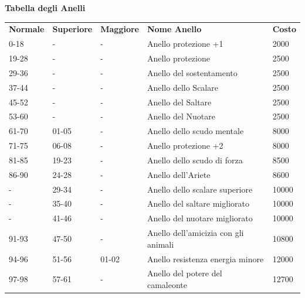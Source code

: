 \documentclass[a4paper,11pt,twoside,openany]{book}
\begin{document}
\textbf{Tabella degli Anelli}

\medskip

\begin{tabular}{lllll}
	\toprule
	\textbf{Normale} & \textbf{Superiore} & \textbf{Maggiore} & \textbf{Nome Anello}    & \textbf{Costo}\\
	0-18             & -  & - & Anello protezione \index{Anello protezione}+1           & 2000\\
	19-28            & -  & - & Anello protezione \index{Anello protezione}             & 2500\\
	29-36            & -  & - & Anello del sostentamento\index{Anello del sostentamento}& 2500\\
	37-44            & -  & - & Anello dello Scalare \index{Anello dello Scalare}       & 2500\\
	45-52            & -  & - & Anello del Saltare \index{Anello del Saltare}           & 2500\\
	53-60            & -  & - & Anello del Nuotare \index{Anello del Nuotare}           & 2500\\
	61-70            & 01-05              & - & Anello dello scudo mentale \index{Anello dello scudo mentale}           & 8000\\
	71-75            & 06-08              & - & Anello protezione +2    & 8000\\
	81-85            & 19-23              & - & Anello dello scudo di forza\index{Anello dello scudo di forza}          & 8500\\
	86-90            & 24-28              & - & Anello dell'Ariete      & 8600\\
	-& 29-34              & - & Anello dello scalare superiore          & 10000\\
	-& 35-40              & - & Anello del saltare migliorato           & 10000\\
	-& 41-46              & - & Anello del nuotare migliorato           & 10000\\
	91-93            & 47-50              & - & Anello dell'amicizia con gli animali \index{Anello dell'amicizia con gli animali}       & 10800\\
	94-96            & 51-56              & 01-02             & Anello resistenza energia minore \index{Anello resistenza energia}      & 12000\\
	97-98            & 57-61              & - & Anello del potere del camaleonte \index{Anello del potere del camaleonte}               & 12700\\

\end{tabular}
\end{document}
